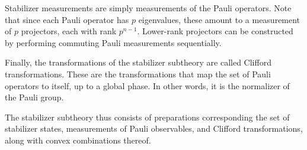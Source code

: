 \documentclass[%
 reprint, onecolumn, 12pt,
superscriptaddress,
nofootinbib,
 prx, 
]{quantumarticle}
\begin{document}
Stabilizer measurements are simply measurements of the Pauli
operators. Note that since each Pauli operator has $p$ eigenvalues,
these amount to a measurement of $p$ projectors, each with rank
$p^{n-1}$. Lower-rank projectors can be constructed by performing
commuting Pauli measurements sequentially.

Finally, the transformations of the stabilizer subtheory are called
Clifford transformations. These are the transformations that map the
set of Pauli operators to itself, up to a global phase. In other
words, it is the normalizer of the Pauli group.

The stabilizer subtheory thus consists of preparations corresponding
the set of stabilizer states, measurements of Pauli observables, and
Clifford transformations, along with convex combinations thereof.
\end{document}

